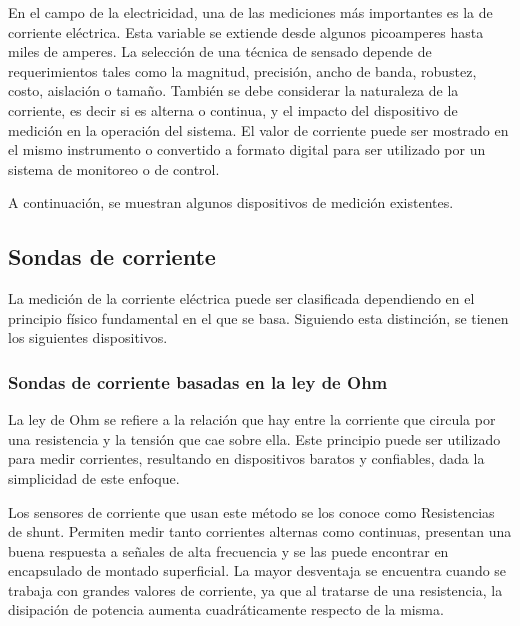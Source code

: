 \documentclass[../informe.tex]{subfiles}
\begin{document}
En el campo de la electricidad, una de las mediciones más importantes es la de corriente eléctrica. Esta variable se extiende desde algunos picoamperes hasta miles de amperes. La selección de una técnica de sensado depende de requerimientos tales como la magnitud, precisión, ancho de banda, robustez, costo, aislación o tamaño. También se debe considerar la naturaleza de la corriente, es decir si es alterna o continua, y el impacto del dispositivo de medición en la operación del sistema. El valor de corriente puede ser mostrado en el mismo instrumento o convertido a formato digital para ser utilizado por un sistema de monitoreo o de control.

A continuación, se muestran algunos dispositivos de medición existentes.

\subsection{Sondas de corriente}
La medición de la corriente eléctrica puede ser clasificada dependiendo en el principio físico fundamental en el que se basa. Siguiendo esta distinción, se tienen los siguientes dispositivos.

  \subsubsection{Sondas de corriente basadas en la ley de Ohm}
  La ley de Ohm se refiere a la relación que hay entre la corriente que circula por una resistencia y la tensión que cae sobre ella. Este principio puede ser utilizado para medir corrientes, resultando en dispositivos baratos y confiables, dada la simplicidad de este enfoque.

  Los sensores de corriente que usan este método se los conoce como Resistencias de shunt. Permiten medir tanto corrientes alternas como continuas, presentan una buena respuesta a señales de alta frecuencia y se las puede encontrar en encapsulado de montado superficial. La mayor desventaja se encuentra cuando se trabaja con grandes valores de corriente, ya que al tratarse de una resistencia, la disipación de potencia aumenta cuadráticamente respecto de la misma.
\end{document}
